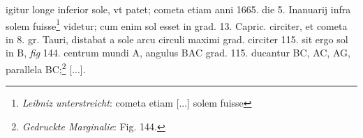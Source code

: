 \pend \pstart [p.~188] [...] igitur longe inferior sole, vt patet; cometa\protect{}  etiam anni 1665. die 5. Inanuarij infra solem fuisse\footnote{\textit{Leibniz unterstreicht}: cometa etiam [...] solem fuisse} videtur;  cum enim sol esset in grad. 13. Capric.\protect{} circiter, et cometa\protect{}  in 8. gr. Tauri\protect{}, distabat a sole arcu circuli maximi grad.  circiter 115. sit ergo sol in B, \textit{fig} 144. centrum mundi\protect{} A,  angulus BAC grad. 115. ducantur BC, AC, AG, parallela BC;\footnote{\textit{Gedruckte Marginalie}: Fig. 144.} [...].